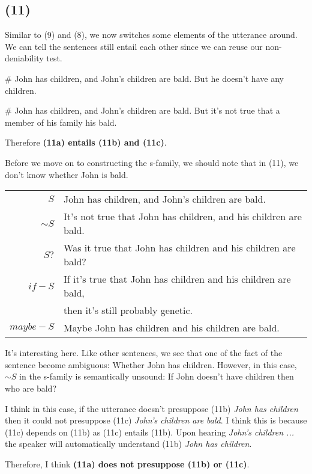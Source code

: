 \documentclass{article}
\begin{document}
\subsection*{(11)} Similar to (9) and (8), we now switches some elements of the utterance around. We can tell the sentences still entail each other since we can reuse our non-deniability test. 

\# John has children, and John’s children are bald. But he doesn't have any children.

\# John has children, and John’s children are bald. But it's not true that a member of his family his bald.

Therefore \textbf{(11a) entails (11b) and (11c)}.

Before we move on to constructing the s-family, we should note that in (11), we don't know whether John is bald. 
\begin{center}
\begin{tabular}{r|l}
    $S$         & John has children, and John's children are bald.       \\
    $\sim S$    & It's not true that John has children, and his children are bald.    \\
    $S?$        & Was it true that John has children and his children are bald?     \\
    $if-S$      & If it's true that John has children and his children are bald,      \\
                & then it's still probably genetic.     \\
    $maybe-S$   & Maybe John has children and his children are bald.\\
\end{tabular}
\end{center}
It's interesting here. Like other sentences, we see that one of the fact of the sentence become ambiguous: Whether John has children. However, in this case, $\sim S$ in the s-family is semantically unsound: If John doesn't have children then who are bald?

I think in this case, if the utterance doesn't presuppose (11b) \textit{John has children} then it could not presuppose (11c) \textit{John's children are bald}. I think this is because (11c) depends on (11b) as (11c) entails (11b). Upon hearing \textit{John's children ...} the speaker will automatically understand (11b) \textit{John has children}. 

Therefore, I think \textbf{(11a) does not presuppose (11b) or (11c)}.
\end{document}
